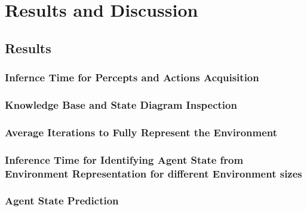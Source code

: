 





\chapter{Results and Discussion} 
\label{Results_and_Discussion}

\section{Results}


\subsection{Infernce Time for Percepts and Actions Acquisition}




\subsection{Knowledge Base and State Diagram Inspection}




\subsection{Average Iterations to Fully Represent the Environment}


\subsection{Inference Time for Identifying Agent State from Environment Representation for different Environment sizes} 



\subsection{Agent State Prediction}



